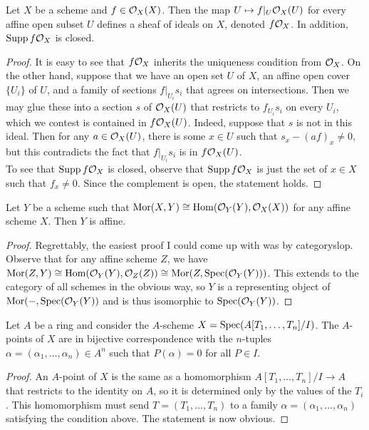 \begin{exer}
	Let $X$ be a scheme and $f \in \mathcal{O}_X(X)$. Then the map
	$U \mapsto f|_U \mathcal{O}_X(U)$ for every affine open subset $U$ defines a
	sheaf of ideals on $X$, denoted $f\mathcal{O}_X$. In addition, $\operatorname{Supp} f\mathcal{O}_X$ is
	closed.
\end{exer}
\begin{proof}
	It is easy to see that $f\mathcal{O}_X$ inherits the uniqueness condition from
	$\mathcal{O}_X$. On the other hand, suppose that we have an open set $U$ of $X$,
	an affine open cover $\{ U_i \}$ of $U$, and a family of sections
	$f|_{U_i}s_i$ that agrees on intersections. Then we may glue these into
	a section $s$ of $\mathcal{O}_X(U)$ that restricts to $f_{U_i}s_i$ on every
	$U_i$, which we contest is contained in $f\mathcal{O}_X(U)$. Indeed, suppose
	that $s$ is not in this ideal. Then for any $a \in \mathcal{O}_X(U)$, there is
	some $x \in U$ such that $s_x - (af)_x \neq 0$, but this contradicts the
	fact that $f|_{U_i}s_i$ is in $f\mathcal{O}_X(U)$.\\

	To see that $\operatorname{Supp} f\mathcal{O}_X$ is closed, observe that $\operatorname{Supp} f\mathcal{O}_X$ is
	just the set of $x \in X$ such that $f_x \neq 0$. Since the complement
	is open, the statement holds.
\end{proof}

\begin{exer}
	Let $Y$ be a scheme such that $\operatorname{Mor}(X,Y) \cong \operatorname{Hom}(\mathcal{O}_Y(Y),\mathcal{O}_X(X))$
	for any affine scheme $X$. Then $Y$ is affine.
\end{exer}
\begin{proof}
	Regrettably, the easiest proof I could come up with was by categoryslop.
	Observe that for any affine scheme $Z$, we have $\operatorname{Mor}(Z,Y) \cong
	\operatorname{Hom}(\mathcal{O}_Y(Y),\mathcal{O}_Z(Z)) \cong \operatorname{Mor}(Z,\operatorname{Spec}(\mathcal{O}_Y(Y)))$. This extends to
	the category of all schemes in the obvious way, so $Y$ is a representing
	object of $\operatorname{Mor}(-,\operatorname{Spec}(\mathcal{O}_Y(Y))$ and is thus isomorphic to
	$\operatorname{Spec}(\mathcal{O}_Y(Y))$.
\end{proof}

\begin{exer}
	Let $A$ be a ring and consider the $A$-scheme $X =
	\operatorname{Spec}(A[T_1,\ldots,T_n]/I)$. The $A$-points of $X$ are in bijective
	correspondence with the $n$-tuples $\alpha = (\alpha_1,\ldots,\alpha_n)
	\in A^n$ such that $P(\alpha) = 0$ for all $P \in I$.
\end{exer}
\begin{proof}
	An $A$-point of $X$ is the same as a homomorphism $A[T_1,\ldots,T_n]/I
	\to A$ that restricts to the identity on $A$, so it is determined only
	by the values of the $T_i$. This homomorphism must send $T =
	(T_1,\ldots,T_n)$ to a family $\alpha = (\alpha_1,\ldots,\alpha_n)$
	satisfying the condition above. The statement is now obvious.
\end{proof}

